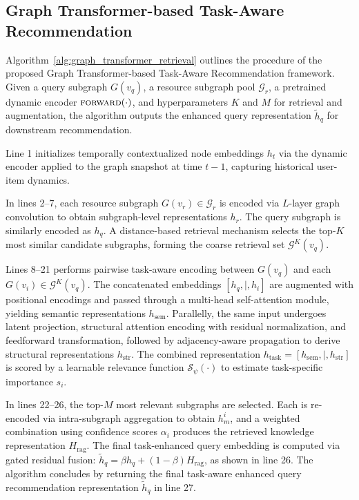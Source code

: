 \documentclass[letterpaper]{article} %
\begin{document}
\subsection{Graph Transformer-based Task-Aware Recommendation}


Algorithm~\ref{alg:graph_transformer_retrieval} outlines the procedure of the proposed Graph Transformer-based Task-Aware Recommendation framework. Given a query subgraph $G(v_q)$, a resource subgraph pool $\mathcal{G}_r$, a pretrained dynamic encoder $\textsc{forward}(\cdot)$, and hyperparameters $K$ and $M$ for retrieval and augmentation, the algorithm outputs the enhanced query representation $\tilde{h}_q$ for downstream recommendation.

Line 1 initializes temporally contextualized node embeddings $h_t$ via the dynamic encoder applied to the graph snapshot at time $t{-}1$, capturing historical user-item dynamics.

In lines 2–7, each resource subgraph $G(v_r) \in \mathcal{G}_r$ is encoded via $L$-layer graph convolution to obtain subgraph-level representations $h_r$. The query subgraph is similarly encoded as $h_q$. A distance-based retrieval mechanism selects the top-$K$ most similar candidate subgraphs, forming the coarse retrieval set $\mathcal{G}^K(v_q)$.

Lines 8–21 performs pairwise task-aware encoding between $G(v_q)$ and each $G(v_i) \in \mathcal{G}^K(v_q)$. The concatenated embeddings $[h_q ,|, h_i]$ are augmented with positional encodings and passed through a multi-head self-attention module, yielding semantic representations $h_{\text{sem}}$. Parallelly, the same input undergoes latent projection, structural attention encoding with residual normalization, and feedforward transformation, followed by adjacency-aware propagation to derive structural representations $h_{\text{str}}$. The combined representation $h_{\text{task}} = [h_{\text{sem}} ,|, h_{\text{str}}]$ is scored by a learnable relevance function $\mathcal{S}_\psi(\cdot)$ to estimate task-specific importance $s_i$.

In lines 22–26, the top-$M$ most relevant subgraphs are selected. Each is re-encoded via intra-subgraph aggregation to obtain $h_m^i$, and a weighted combination using confidence scores $\alpha_i$ produces the retrieved knowledge representation $H_{\text{rag}}$. The final task-enhanced query embedding is computed via gated residual fusion: $\tilde{h}_q = \beta h_q + (1 - \beta) H_{\text{rag}}$, as shown in line 26. The algorithm concludes by returning the final task-aware enhanced query recommendation representation $\tilde{h}_q$ in line 27.
\end{document}
